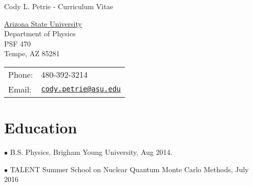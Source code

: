 \documentclass[letterpaper,10pt]{article}
\def\name{Cody L. Petrie - Curriculum Vitae}
\renewenvironment{itemize}{
  \begin{list}{}{
    \setlength{\leftmargin}{1.5em}
  }
}{
  \end{list}
}
\begin{document}
{\huge \name}

\vspace{0.25in}

\begin{minipage}{0.45\linewidth}
  \href{http://www.asu.edu/}{Arizona State University} \\
  Department of Physics\\
  PSF 470 \\
  Tempe, AZ 85281
\end{minipage}
\begin{minipage}{0.45\linewidth}
  \begin{tabular}{ll}
    Phone: & 480-392-3214 \\
    Email: & \href{mailto:cody.petrie@asu.edu}{\tt cody.petrie@asu.edu} \\
  \end{tabular}
\end{minipage}

\section*{Education}

\begin{itemize}

  \item $\bullet$ B.S. Physics, Brigham Young University, Aug 2014.

  \item $\bullet$ TALENT Summer School on Nuclear Quantum Monte Carlo Methods, July 2016

\end{itemize}
\end{document}
